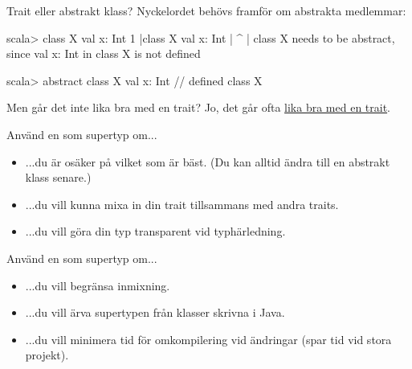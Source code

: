 
\begin{Slide}{Trait eller abstrakt klass?}\SlideFontSmall
Nyckelordet  behövs framför  om abstrakta medlemmar:
\begin{REPLsmall}
scala> class X { val x: Int }
1 |class X { val x: Int }
  |      ^
  |      class X needs to be abstract, since val x: Int in class X is not defined 

scala> abstract class X { val x: Int }
// defined class X
\end{REPLsmall}  
Men går det inte lika bra med en trait? \pause Jo, det går ofta \href{https://youtu.be/aFmIS5qeetA?t=221}{lika bra med en trait}.

\label{slideW07:traitorclass}
\begin{multicols}{2}
\noindent Använd en  som supertyp om...
\begin{itemize}
\item ...du är osäker på vilket som är bäst. (Du kan alltid ändra till en abstrakt klass senare.)
\item ...du vill kunna mixa in din trait tillsammans med andra traits.
\item ...du vill göra din typ transparent vid typhärledning.

\end{itemize}

\columnbreak

\noindent Använd en  som supertyp om...
\begin{itemize}
\item ...du vill begränsa inmixning. 
\item ...du vill ärva supertypen från klasser skrivna i Java.
\item ...du vill minimera tid för omkompilering vid ändringar (spar tid vid stora projekt).
\end{itemize}


\end{multicols}
\end{Slide}

